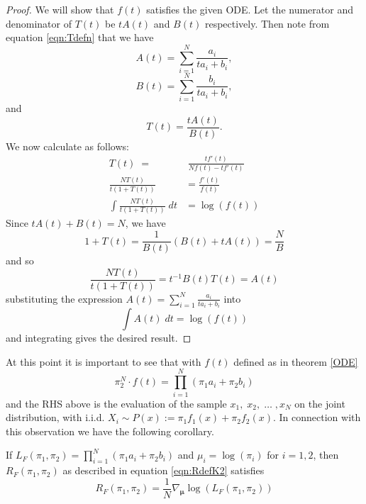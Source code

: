 \begin{proof}
We will show that $f(t)$ satisfies the given ODE.  Let the numerator and denominator of $T(t)$ be $tA(t)$ and $B(t)$ respectively.  Then note from equation \eqref{eqn:Tdefn} that we have \[A(t)=\sum_{i=1}^N \frac{a_i}{ta_i+b_i},\] \[B(t)=\sum_{i=1}^N \frac{b_i}{ta_i+b_i},\] and \[T(t)=\frac{tA(t)}{B(t)}.\]
We now calculate as follows:
\begin{align}
T(t)\;=&\;\frac{tf'(t)}{Nf(t)-tf'(t)}\nonumber \\ 
\frac{NT(t)}{t(1+T(t))}&=\frac{f'(t)}{f(t)}\nonumber \\ 
\int\frac{NT(t)}{t(1+T(t))}\;dt&=\log(f(t)) \label{eqn:logDeriv}
\end{align}
Since $tA(t)+B(t)=N$, we have 
\[1+T(t)=\frac{1}{B(t)}(B(t)+tA(t))=\frac{N}{B}\]
and so
\[\frac{NT(t)}{t(1+T(t))}=t^{-1}B(t)T(t)=A(t)\]
substituting the expression $A(t)=\sum_{i=1}^N \frac{a_i}{ta_i+b_i}$ into 
\[\int A(t)\;dt=\log(f(t))\]
and integrating gives the desired result.
\end{proof} 
At this point it is important to see that with $f(t)$ defined as in theorem \ref{ODE}
\begin{equation}
\pi_2^N\cdot f(t)=\prod_{i=1}^N (\pi_1a_i+\pi_2b_i)
\end{equation}
and the RHS above is the evaluation of the sample $x_1,\;x_2,\;\ldots\;,x_N$ on the joint distribution, with  i.i.d. $X_i\sim P(x):=\pi_1 f_1(x)+\pi_2 f_2(x)$. In connection with this observation we have the following corollary.
\begin{cor}\label{cor:RgradK2}
	If \( L_F(\pi_1,\pi_2) =  \prod_{i=1}^N (\pi_1a_i+\pi_2b_i)\) and \( \mu_i =\log(\pi_i) \) for \( i=1,2 \), then \( R_F(\pi_1,\pi_2) \) as described in equation \eqref{eqn:RdefK2} satisfies
	\begin{equation}
	R_F(\pi_1,\pi_2) = \frac 1N \nabla_{\bm\mu}\log(L_F(\pi_1,\pi_2))
	\end{equation} 
\end{cor}

